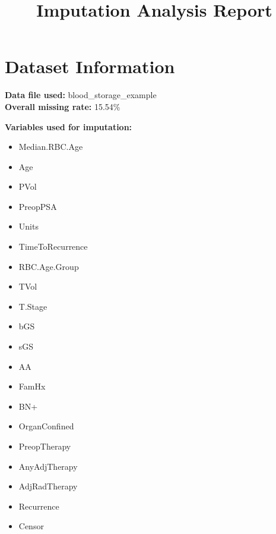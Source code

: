 \documentclass[
]{article}
\title{Imputation Analysis Report}
\author{}
\date{\vspace{-2.5em}}
\providecommand{\tightlist}{%
  \setlength{\itemsep}{0pt}\setlength{\parskip}{0pt}}
\begin{document}
\maketitle

\section{Dataset Information}\label{dataset-information}

\textbf{Data file used:} blood\_storage\_example\\
\textbf{Overall missing rate:} 15.54\%

\textbf{Variables used for imputation:}

\begin{itemize}
\tightlist
\item
  Median.RBC.Age\\
\item
  Age\\
\item
  PVol\\
\item
  PreopPSA\\
\item
  Units\\
\item
  TimeToRecurrence\\
\item
  RBC.Age.Group\\
\item
  TVol\\
\item
  T.Stage\\
\item
  bGS\\
\item
  sGS\\
\item
  AA\\
\item
  FamHx\\
\item
  BN+\\
\item
  OrganConfined\\
\item
  PreopTherapy\\
\item
  AnyAdjTherapy\\
\item
  AdjRadTherapy\\
\item
  Recurrence\\
\item
  Censor
\end{itemize}
\end{document}
